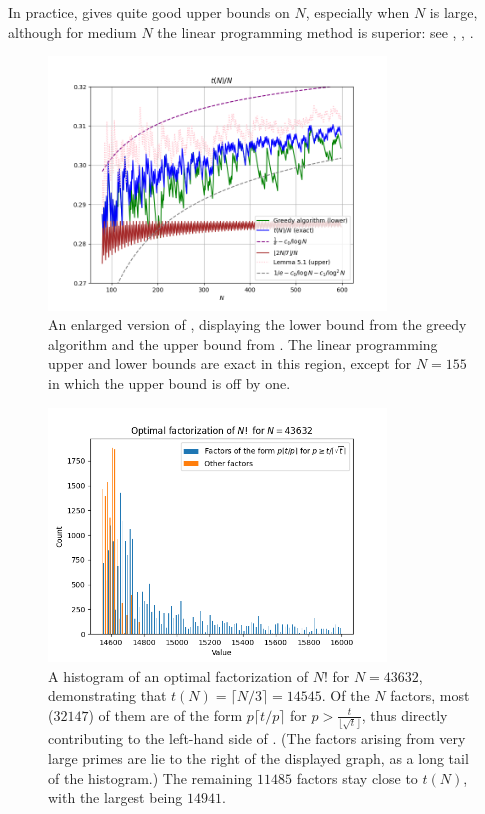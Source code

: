 \documentclass[12pt,a4paper,reqno]{amsart}
\numberwithin{equation}{section}
\theoremstyle{plain}
\theoremstyle{definition}
\begin{document}
In practice,  gives quite good upper bounds on $N$, especially when $N$ is large, although for medium $N$ the linear programming method is superior: see , , .
    
\begin{figure}
  \centering
  \includegraphics[width=0.8\textwidth]{newplot_600.png}
  \caption{An enlarged version of , displaying the lower bound from the greedy algorithm and the upper bound from .  The linear programming upper and lower bounds are exact in this region, except for $N=155$ in which the upper bound is off by one.}\label{fig-zoom}
\end{figure}


\begin{figure}
  \centering
  \includegraphics[width=0.8\textwidth]{factors.png}
  \caption{A histogram of an optimal factorization of $N!$ for $N=43632$, demonstrating that $t(N) = \lceil N/3\rceil = 14545$.  Of the $N$ factors, most ($\num{32147}$) of them are of the form $p \lceil t/p \rceil$ for $p > \frac{t}{\lfloor \sqrt{t} \rfloor}$, thus directly contributing to the left-hand side of .  (The factors arising from very large primes are lie to the right of the displayed graph, as a long tail of the histogram.)  The remaining $\num{11485}$ factors stay close to $t(N)$, with the largest being $14941$.
  }\label{fig-factor}
  \end{figure}
  
\end{document}
